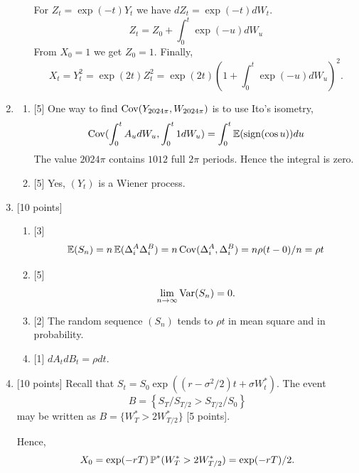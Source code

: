 \documentclass[12pt, a4paper]{article}
\begin{document}
\begin{enumerate}
\begin{enumerate}
    For $Z_t = \exp(-t) Y_t$ we have $dZ_t = \exp(-t) dW_t$.
    \[
    Z_t = Z_0 + \int_0^t \exp(-u) dW_u  
    \]
    From $X_0 = 1$ we get $Z_0= 1$.
    Finally,
    \[
    X_t = Y_t^2 = \exp(2t) Z_t^2 = \exp(2t) \left(1 + \int_0^t \exp(-u) dW_u    \right)^2.
    \]

\end{enumerate}

\item 
\begin{enumerate}
    \item {[5]} One way to find $\Cov(Y_{2024\pi}, W_{2024\pi})$
    is to use Ito's isometry, 
    \[
    \Cov(\int_0^t A_u dW_u, \int_0^t 1 dW_u) = \int_0^t \E(\sign (\cos u)) du   
    \]
    The value $2024\pi$ contains $1012$ full $2\pi$ periods. Hence the integral is zero. 
  
    \item {[5]} Yes, $(Y_t)$ is a Wiener process. 
    
\end{enumerate}


    
\item {[10 points]}
\begin{enumerate}
    \item {[3]} 
    \[
    \E(S_n) = n \E( \Delta^A_i \Delta^B_i) = n\Cov(\Delta^A_i, \Delta^B_i) = n \rho (t-0)/n = \rho t
    \]
    \item {[5]} 
    \[
      \lim_{n\to\infty} \Var(S_n) = 0.
      \]
    \item {[2]} The random sequence $(S_n)$ tends to $\rho t$ in mean square and in probability. 
    \item {[1]} $dA_t dB_t = \rho dt$.
\end{enumerate}



\item {[10 points]} 
Recall that $S_t = S_0 \exp((r - \sigma^2/2)t + \sigma W_t^*)$.
The event 
\[
B = \left\{  S_T / S_{T/2} > S_{T/2} / S_0  \right\}
\]
may be written as $B = \{ W_T^* > 2 W_{T/2}^* \}$ {[5 points]}.

Hence,
\[
X_0 = \exp(-rT)\P^*(W_T^* > 2 W_{T/2}^*) = \exp(-rT) / 2.  
\]

\end{enumerate}
\end{document}
